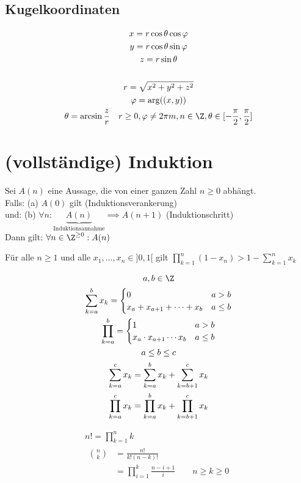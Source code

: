 \subsection{Kugelkoordinaten}
\begin{gather*}
	x = r \cos \theta \cos \varphi \\
	y = r \cos \theta \sin \varphi \\
	z = r \sin \theta \\
	\\
	r = \sqrt{x^2 + y^2 + z^2} \\
	\varphi = \arg((x,y)) \\
	\theta = \arcsin \frac{z}{r} \quad r \geq 0 , \varphi \neq 2\pi m , n \in \Z , \theta \in [ -\frac{\pi}{2} , \frac{\pi}{2} ]
\end{gather*}

\section{(vollständige) Induktion}
Sei $A(n)$ eine Aussage, die von einer ganzen Zahl $n \geq 0$ abhängt.\\
Falls: (a) $A(0)$ gilt (Induktionsverankerung) \\
und: (b) $\forall n : \underbrace{A(n)}_{\text{Induktionsannahme}} \implies A(n+1)$ (Induktionschritt) \\
Dann gilt: $\forall n \in \Z^{\geq 0} : A(n)$\\
\begin{satz*}
	Für alle $n \geq 1$ und alle $x_1, \dotsc , x_n \in ]0,1[$ gilt $\prod_{k=1}^n (1-x_n) > 1 - \sum_{k=1}^n x_k$\\
	\begin{bem}[note = Erinnerung]
		\begin{gather*}
			a, b \in \Z \\
			\sum_{k=a}^b x_k = \begin{cases}
				0						&a > b	\\
				x_a + x_{a+1} + \dots + x_b	&a \leq b	
			\end{cases} \\
			\prod_{k=a}^b = \begin{cases}
				1						&a > b	\\
				x_a \cdot x_{a+1} \dotsm x_b	&a \leq b
			\end{cases}\\
			a \leq b \leq c \\
			\sum_{k=a}^c x_k = \sum_{k=a}^b x_k + \sum_{k=b+1}^c x_k \\
			\prod_{k=a}^c x_k = \prod_{k=a}^b x_k + \prod_{k=b+1}^c x_k
		\end{gather*}
	\end{bem}
	\begin{bsp*}
		\begin{gather*}
			n! = \prod_{k=1}^n k \\
			\begin{split}
				\binom{n}{k} &= \frac{n!}{k!(n-k)!} \\
					&= \prod_{i=1}^k \frac{n-i+1}{i} \qquad n \geq k \geq 0
			\end{split}
		\end{gather*}
	\end{bsp*}
\end{satz*}
